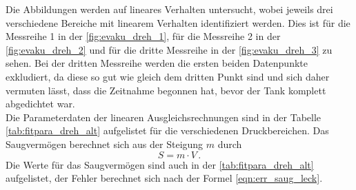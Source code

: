     \noindent Die Abbildungen werden auf lineares Verhalten untersucht, wobei jeweils drei verschiedene Bereiche mit linearem Verhalten identifiziert werden. 
    Dies ist für die Messreihe 1 in der \autoref{fig:evaku_dreh_1}, für die Messreihe 2 in der \autoref{fig:evaku_dreh_2} und für die dritte Messreihe in der 
    \autoref{fig:evaku_dreh_3} zu sehen. Bei der dritten Messreihe werden die ersten beiden Datenpunkte exkludiert, da diese so gut wie gleich dem dritten Punkt sind und sich 
    daher vermuten lässt, dass die Zeitnahme begonnen hat, bevor der Tank komplett abgedichtet war.\\ 
    Die Parameterdaten der linearen Ausgleichsrechnungen sind in der Tabelle \autoref{tab:fitpara_dreh_alt} aufgelistet für die verschiedenen Druckbereichen. Das Saugvermögen berechnet sich 
    aus der Steigung $m$ durch 
    \begin{equation*}
      S = m \cdot V\, .
    \end{equation*}
    Die Werte für das Saugvermögen sind auch in der \autoref{tab:fitpara_dreh_alt} aufgelistet, der Fehler berechnet sich nach der Formel \eqref{eqn:err_saug_leck}. 

